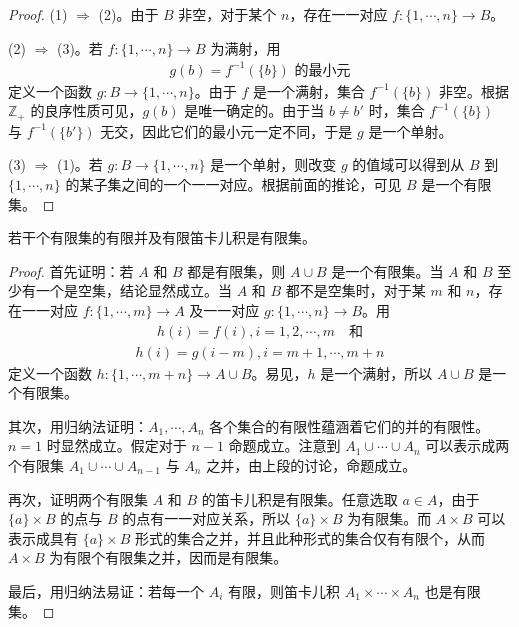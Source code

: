 \documentclass[../../main.tex]{subfiles}
\begin{document}
\begin{proof}
(1) $\Longrightarrow$ (2)。由于 $B$ 非空，对于某个 $n$，存在一一对应 $f: \{1, \cdots, n\} \longrightarrow B$。

(2) $\Longrightarrow$ (3)。若 $f: \{1, \cdots, n\} \longrightarrow B$ 为满射，用
\begin{align*}
g(b) = f^{-1}(\{b\}) \text{ 的最小元}
\end{align*}
定义一个函数 $g: B \longrightarrow \{1, \cdots, n\}$。由于 $f$ 是一个满射，集合 $f^{-1}(\{b\})$ 非空。根据 $\mathbb{Z}_{+}$ 的良序性质可见，$g(b)$ 是唯一确定的。由于当 $b \neq b'$ 时，集合 $f^{-1}(\{b\})$ 与 $f^{-1}(\{b'\})$ 无交，因此它们的最小元一定不同，于是 $g$ 是一个单射。

(3) $\Longrightarrow$ (1)。若 $g: B \longrightarrow \{1, \cdots, n\}$ 是一个单射，则改变 $g$ 的值域可以得到从 $B$ 到 $\{1, \cdots, n\}$ 的某子集之间的一个一一对应。根据前面的推论，可见 $B$ 是一个有限集。
\end{proof}

\begin{corollary}\label{corollary:ch01-有限并与积}
若干个有限集的有限并及有限笛卡儿积是有限集。
\end{corollary}

\begin{proof}
首先证明：若 $A$ 和 $B$ 都是有限集，则 $A \cup B$ 是一个有限集。当 $A$ 和 $B$ 至少有一个是空集，结论显然成立。当 $A$ 和 $B$ 都不是空集时，对于某 $m$ 和 $n$，存在一一对应 $f: \{1, \cdots, m\} \longrightarrow A$ 及一一对应 $g: \{1, \cdots, n\} \longrightarrow B$。用
\begin{align*}
h(i) = f(i), i = 1, 2, \cdots, m \quad \text{和}
\end{align*}
\begin{align*}
h(i) = g(i - m), i = m + 1, \cdots, m + n
\end{align*}
定义一个函数 $h: \{1, \cdots, m+n\} \longrightarrow A \cup B$。易见，$h$ 是一个满射，所以 $A \cup B$ 是一个有限集。

其次，用归纳法证明：$A_{1}, \cdots, A_{n}$ 各个集合的有限性蕴涵着它们的并的有限性。$n = 1$ 时显然成立。假定对于 $n-1$ 命题成立。注意到 $A_{1} \cup \cdots \cup A_{n}$ 可以表示成两个有限集 $A_{1} \cup \cdots \cup A_{n-1}$ 与 $A_{n}$ 之并，由上段的讨论，命题成立。

再次，证明两个有限集 $A$ 和 $B$ 的笛卡儿积是有限集。任意选取 $a \in A$，由于 $\{a\} \times B$ 的点与 $B$ 的点有一一对应关系，所以 $\{a\} \times B$ 为有限集。而 $A \times B$ 可以表示成具有 $\{a\} \times B$ 形式的集合之并，并且此种形式的集合仅有有限个，从而 $A \times B$ 为有限个有限集之并，因而是有限集。

最后，用归纳法易证：若每一个 $A_{i}$ 有限，则笛卡儿积 $A_{1} \times \cdots \times A_{n}$ 也是有限集。
\end{proof}
\end{document}
